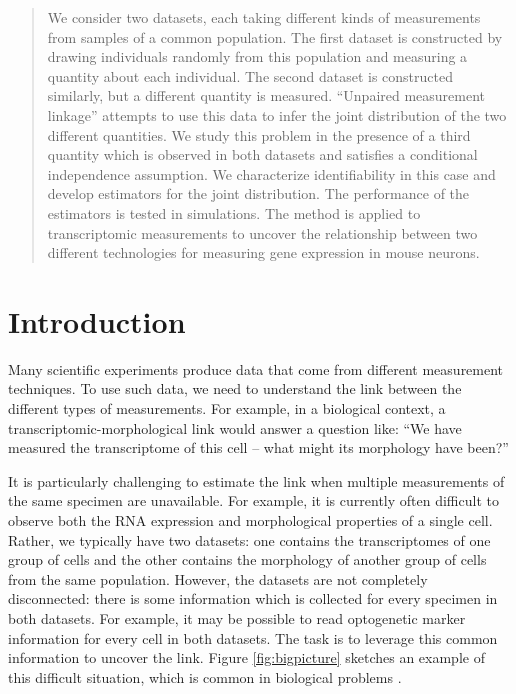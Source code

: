 \documentclass{article}
\theoremstyle{definition}
\begin{document}
\begin{abstract}
We consider two datasets, each taking different kinds of measurements from samples of a common population.  The first dataset is constructed by drawing individuals randomly from this population and measuring a quantity about each individual.   The second dataset is constructed similarly, but a different quantity is measured.  ``Unpaired measurement linkage'' attempts to use this data to infer the joint distribution of the two different quantities.  We study this problem in the presence of a third quantity which is observed in both datasets and satisfies a conditional independence assumption.  We characterize identifiability in this case and develop estimators for the joint distribution.  The performance of the estimators is tested in simulations.  The method is applied to transcriptomic measurements to uncover the relationship between two different technologies for measuring gene expression in mouse neurons.
\end{abstract}

\section{Introduction}

Many scientific experiments produce data that come from different measurement techniques.  To use such data, we need to understand the link between the different types of measurements.  For example, in a biological context, a transcriptomic-morphological link would answer a question like:  ``We have measured the transcriptome of this cell -- what might its morphology have been?''

It is particularly challenging to estimate the link when multiple measurements of the same specimen are unavailable.  For example, it is currently often difficult to observe both the RNA expression and morphological properties of a single cell.  Rather, we typically have two datasets: one contains the transcriptomes of one group of cells and the other contains the morphology of another group of cells from the same population.   However, the datasets are not completely disconnected: there is some information which is collected for every specimen in both datasets.  For example, it may be possible to read optogenetic marker information for every cell in both datasets.  The task is to leverage this common information to uncover the link.  Figure \ref{fig:bigpicture} sketches an example of this difficult situation, which is common in biological problems \cite{gouwens2018classification}.
\end{document}

